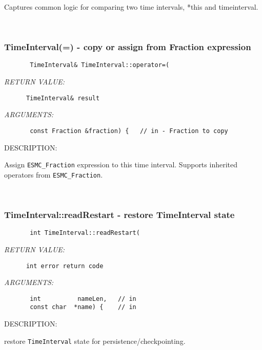         Captures common logic for comparing two time intervals, *this and
        timeinterval.
   
 
\mbox{}\hrulefill\ 
 
\subsubsection [TimeInterval(=)] {TimeInterval(=) - copy or assign from Fraction expression}


  
\begin{verbatim}       TimeInterval& TimeInterval::operator=(\end{verbatim}{\em RETURN VALUE:}
\begin{verbatim}      TimeInterval& result\end{verbatim}{\em ARGUMENTS:}
\begin{verbatim}       const Fraction &fraction) {   // in - Fraction to copy\end{verbatim}
{\sf DESCRIPTION:\\ }


      Assign {\tt ESMC\_Fraction} expression to this time interval.
      Supports inherited operators from {\tt ESMC\_Fraction}.
   
 
\mbox{}\hrulefill\ 
 
\subsubsection [TimeInterval::readRestart] {TimeInterval::readRestart - restore TimeInterval state}


  
\begin{verbatim}       int TimeInterval::readRestart(\end{verbatim}{\em RETURN VALUE:}
\begin{verbatim}      int error return code\end{verbatim}{\em ARGUMENTS:}
\begin{verbatim}       int          nameLen,   // in
       const char  *name) {    // in\end{verbatim}
{\sf DESCRIPTION:\\ }


        restore {\tt TimeInterval} state for persistence/checkpointing.
   
